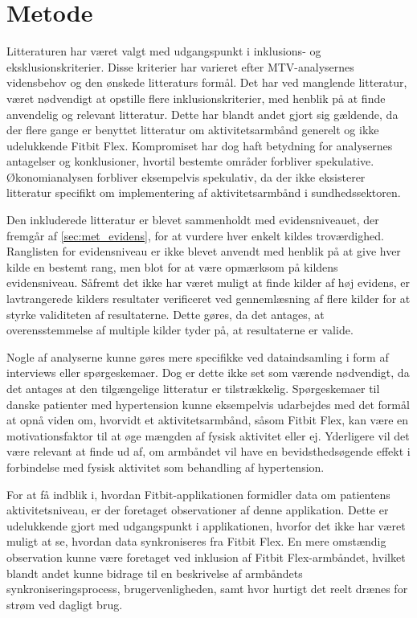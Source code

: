 \section{Metode}
Litteraturen har været valgt med udgangspunkt i inklusions- og eksklusionskriterier. Disse kriterier har varieret efter MTV-analysernes vidensbehov og den ønskede litteraturs formål. Det har ved manglende litteratur, været nødvendigt at opstille flere inklusionskriterier, med henblik på at finde anvendelig og relevant litteratur. Dette har blandt andet gjort sig gældende, da der flere gange er benyttet litteratur om aktivitetsarmbånd generelt og ikke udelukkende Fitbit Flex. Kompromiset har dog haft betydning for analysernes antagelser og konklusioner, hvortil bestemte områder forbliver spekulative. Økonomianalysen forbliver eksempelvis spekulativ, da der ikke eksisterer litteratur specifikt om implementering af aktivitetsarmbånd i sundhedssektoren. 

Den inkluderede litteratur er blevet sammenholdt med evidensniveauet, der fremgår af \autoref{sec:met_evidens}, for at vurdere hver enkelt kildes troværdighed. Ranglisten for evidensniveau er ikke blevet anvendt med henblik på at give hver kilde en bestemt rang, men blot for at være opmærksom på kildens evidensniveau. Såfremt det ikke har været muligt at finde kilder af høj evidens, er lavtrangerede kilders resultater verificeret ved gennemlæsning af flere kilder for at styrke validiteten af resultaterne.  Dette gøres, da det antages, at overensstemmelse af multiple kilder tyder på, at resultaterne er valide. 

Nogle af analyserne kunne gøres mere specifikke ved dataindsamling i form af interviews eller spørgeskemaer. Dog er dette ikke set som værende nødvendigt, da det antages at den tilgængelige litteratur er tilstrækkelig. Spørgeskemaer til danske patienter med hypertension kunne eksempelvis udarbejdes med det formål at opnå viden om, hvorvidt et aktivitetsarmbånd, såsom Fitbit Flex, kan være en motivationsfaktor til at øge mængden af fysisk aktivitet eller ej. Yderligere vil det være relevant at finde ud af, om armbåndet vil have en bevidsthedsøgende effekt i forbindelse med fysisk aktivitet som behandling af hypertension. 

For at få indblik i, hvordan Fitbit-applikationen formidler data om patientens aktivitetsniveau, er der foretaget observationer af denne applikation. Dette er udelukkende gjort med udgangspunkt i applikationen, hvorfor det ikke  har været muligt at se, hvordan data synkroniseres fra Fitbit Flex. En mere omstændig observation kunne være foretaget ved inklusion af Fitbit Flex-armbåndet, hvilket blandt andet kunne bidrage til en beskrivelse af armbåndets synkroniseringsprocess, brugervenligheden, samt hvor hurtigt det reelt drænes for strøm ved dagligt brug.  